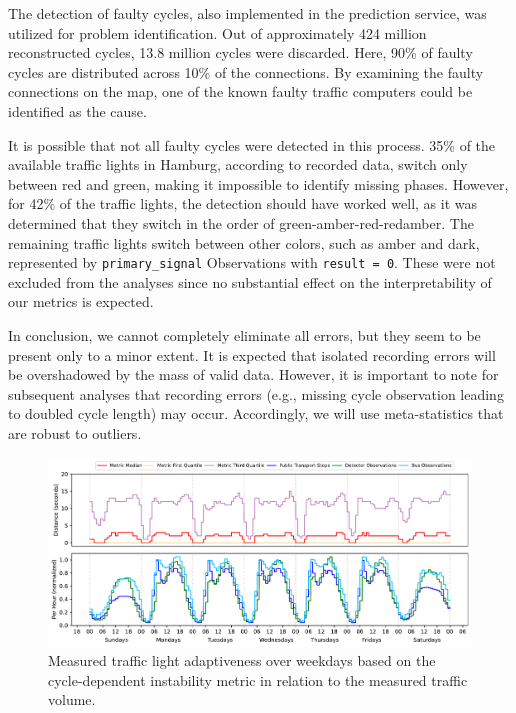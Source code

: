 The detection of faulty cycles, also implemented in the prediction service, was utilized for problem identification. Out of approximately 424 million reconstructed cycles, 13.8 million cycles were discarded. Here, 90\% of faulty cycles are distributed across 10\% of the connections. By examining the faulty connections on the map, one of the known faulty traffic computers could be identified as the cause.

It is possible that not all faulty cycles were detected in this process. 35\% of the available traffic lights in Hamburg, according to recorded data, switch only between red and green, making it impossible to identify missing phases. However, for 42\% of the traffic lights, the detection should have worked well, as it was determined that they switch in the order of green-amber-red-redamber. The remaining traffic lights switch between other colors, such as amber and dark, represented by \texttt{primary\_signal} Observations with \texttt{result = 0}. These were not excluded from the analyses since no substantial effect on the interpretability of our metrics is expected.

In conclusion, we cannot completely eliminate all errors, but they seem to be present only to a minor extent. It is expected that isolated recording errors will be overshadowed by the mass of valid data. However, it is important to note for subsequent analyses that recording errors (e.g., missing cycle observation leading to doubled cycle length) may occur. Accordingly, we will use meta-statistics that are robust to outliers.

\begin{figure}[t]
    \centering
    \includegraphics[width=\linewidth]{images/adaptiveness-weekdays-distance.pdf}
    \caption{Measured traffic light adaptiveness over weekdays based on the cycle-dependent instability metric in relation to the measured traffic volume.}\label{fig:adaptiveness-weekdays-distance}
\end{figure}

